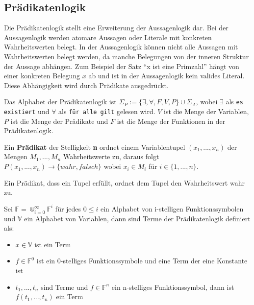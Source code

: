 \subsection{Prädikatenlogik}
Die Prädikatenlogik stellt eine Erweiterung der Aussagenlogik dar.
Bei der Aussagenlogik werden atomare Aussagen oder Literale mit konkreten
Wahrheitswerten belegt. In der Aussagenlogik können nicht alle Aussagen
mit Wahrheitswerten belegt werden, da manche Belegungen von der inneren
Struktur der Aussage abhängen. Zum Beispiel der Satz "`x ist eine Primzahl"'
hängt von einer konkreten Belegung $x$ ab und ist in der Aussagenlogik kein
valides Literal. Diese Abhängigkeit wird durch Prädikate ausgedrückt.~\cite{heinemann2013logik}

\begin{defi}
  Das Alphabet der Prädikatenlogik ist $\Sigma_P := \{\exists,\forall,F,V,P\} \cup \Sigma_A$, wobei
  $\exists$ als \texttt{es existiert} und $\forall$ als \texttt{für alle gilt} gelesen wird.
  $V$ ist die Menge der Variablen, $P$ ist die Menge der Prädikate und $F$ ist die Menge der
  Funktionen in der Prädikatenlogik.
\end{defi}

\begin{defi}
  Ein \textbf{Prädikat} der Stelligkeit \textbf{n} ordnet einem Variablentupel
  $(x_1,...,x_n)$ der Mengen $M_1,...,M_n$ Wahrheitswerte zu, daraus folgt
  $P(x_1,...,x_n) \rightarrow \{wahr, falsch\}$ wobei $x_i\in M_i$ für $i\in \{1,...,n\}$.
\end{defi}
Ein Prädikat, dass ein Tupel erfüllt, ordnet dem Tupel den Wahrheitswert wahr zu.

\begin{defi}
  Sei $\mathbb{F}=\Cup^{\infty}_{i=0}\mathbb{F}^i$ für jedes $0\le i$ ein Alphabet von
  i-stelligen Funktionssymbolen und $\mathbb{V}$ ein Alphabet von Variablen,
  dann sind Terme der Prädikatenlogik definiert als:
  \begin{itemize}
  \item $x\in\mathbb{V}$ ist ein Term
  \item $f\in\mathbb{F}^0$ ist ein 0-stelliges Funktionssymbole und eine Term der
    eine Konstante ist
  \item $t_1,...,t_n$ sind Terme und $f\in\mathbb{F}^n$ ein n-stelliges
    Funktionssymbol, dann ist $f(t_1,...,t_n)$ ein Term
  \end{itemize}  
\end{defi}~\cite{kreitz1994automatisierte}


